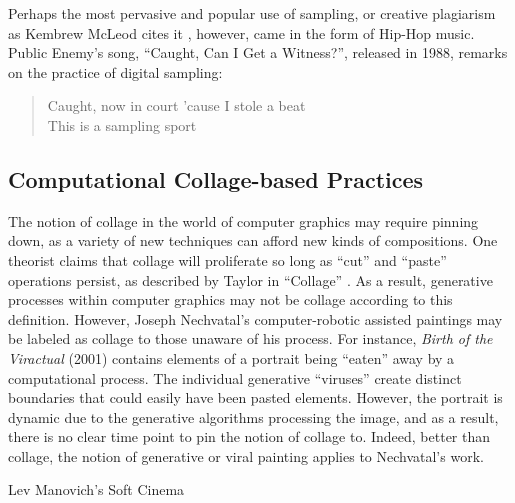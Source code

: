 Perhaps the most pervasive and popular use of sampling, or creative plagiarism as Kembrew McLeod cites it \cite{McLeod2011}, however, came in the form of Hip-Hop music.  Public Enemy's song, ``Caught, Can I Get a Witness?'', released in 1988, remarks on the practice of digital sampling: 
\begin{verse}
Caught, now in court 'cause I stole a beat\\
This is a sampling sport
\end{verse}


\subsection{Computational Collage-based Practices}

The notion of collage in the world of computer graphics may require pinning down, as a variety of new techniques can afford new kinds of compositions.  One theorist claims that collage will proliferate so long as ``cut'' and ``paste'' operations persist, as described by Taylor in ``Collage'' \cite{}.   As a result, generative processes within computer graphics may not be collage according to this definition.  However, Joseph Nechvatal's computer-robotic assisted paintings may be labeled as collage to those unaware of his process.  For instance, \textit{Birth of the Viractual} (2001) contains elements of a portrait being ``eaten'' away by a computational process.  The individual generative ``viruses'' create distinct boundaries that could easily have been pasted elements.  However, the portrait is dynamic due to the generative algorithms processing the image, and as a result, there is no clear time point to pin the notion of collage to.  Indeed, better than collage, the notion of generative or viral painting applies to Nechvatal's work. 

Lev Manovich's Soft Cinema

